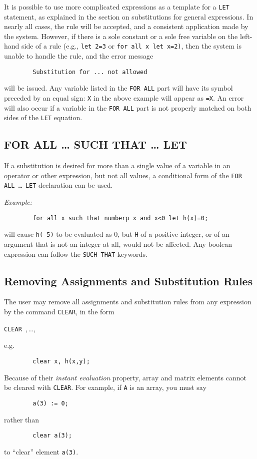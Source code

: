 It is possible to use more complicated expressions as a template for a
\texttt{LET} statement, as explained in the section on substitutions for
general expressions.  In nearly all cases, the rule will be accepted, and
a consistent application made by the system.  However, if there is a sole
constant or a sole free variable on the left-hand side of a rule (e.g.,
\texttt{let 2=3} or \texttt{for all x let x=2)}, then the system is unable to
handle the rule, and the error message
\begin{verbatim}
        Substitution for ... not allowed
\end{verbatim}
will be issued.  Any variable listed in the \texttt{FOR ALL} part will have
its symbol preceded by an equal sign: \texttt{X} in the above example will
appear as \texttt{=X}.  An error will also occur if a variable in the
\texttt{FOR ALL} part is not properly matched on both sides of the \texttt{LET}
equation.

\subsection{FOR ALL \ldots{} SUCH THAT \ldots{} LET}
\hypertarget{command:SUCHTHAT}{}

If a substitution is desired for more than a single value of a variable in
an operator or other expression, but not all values, a conditional form of
the \texttt{FOR ALL \ldots{} LET} declaration can be used.

\textit{Example:}
\begin{verbatim}
        for all x such that numberp x and x<0 let h(x)=0;
\end{verbatim}
will cause \texttt{h(-5)} to be evaluated as 0, but \texttt{H} of a positive
integer, or of an argument that is not an integer at all, would not be
affected.  Any boolean expression can follow the \texttt{SUCH THAT} keywords.

\hypertarget{reserved:CLEAR}{\subsection{Removing Assignments and Substitution Rules}}

The user may remove all assignments and substitution rules from any
expression by the command \texttt{CLEAR}, in the form
\begin{syntax}
  \texttt{CLEAR },\,\dots,\,
\end{syntax}
e.g.
\begin{verbatim}
        clear x, h(x,y);
\end{verbatim}
Because of their \emph{instant evaluation} property, array and matrix elements
cannot be cleared with \texttt{CLEAR}.  For example, if \texttt{A} is an array,
you must say
\begin{verbatim}
        a(3) := 0;
\end{verbatim}
rather than
\begin{verbatim}
        clear a(3);
\end{verbatim}
to ``clear'' element \texttt{a(3)}.

